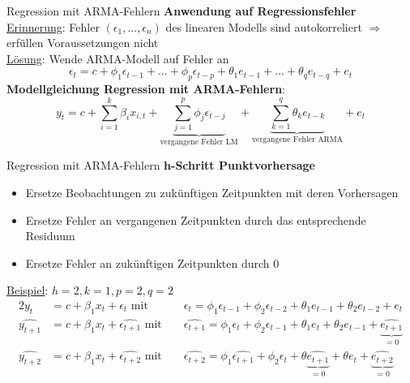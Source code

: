 \begin{frame}{Regression mit ARMA-Fehlern}
	\textbf{Anwendung auf Regressionsfehler} \\
	\underline{Erinnerung}: Fehler $(\epsilon_1,...,\epsilon_n)$ des linearen Modells sind autokorreliert $\Rightarrow$ erfüllen Voraussetzungen nicht\\
	\underline{Lösung}: Wende ARMA-Modell auf Fehler an
	$$\epsilon_{t} = c + \phi_1 \epsilon_{t-1} + ... + \phi_p \epsilon_{t-p} + \theta_1 e_{t-1} + ... + \theta_q e_{t-q} + e_t$$
	\textbf{Modellgleichung Regression mit ARMA-Fehlern}:
	$$y_t = c + \sum_{i=1}^{k}{\beta_i x_{i,t}} + \underbrace{\sum_{j=1}^{p}{\phi_j\epsilon_{t-j}}}_{\text{vergangene Fehler LM}} + \underbrace{\sum_{k=1}^{q}{\theta_k e_{t-k}}}_{\text{vergangene Fehler ARMA}} + e_t$$
	
\end{frame}
\begin{frame}{Regression mit ARMA-Fehlern}
	\textbf{h-Schritt Punktvorhersage}\\
	\begin{itemize}
		\item Ersetze Beobachtungen zu zukünftigen Zeitpunkten mit deren Vorhersagen
		\item Ersetze Fehler an vergangenen Zeitpunkten durch das entsprechende Residuum
		\item Ersetze Fehler an zukünftigen Zeitpunkten durch 0
	\end{itemize}
	\underline{Beispiel}: $h=2, k=1, p=2, q=2$
	\begin{alignat*}{2}
		y_t &= c + \beta_1 x_{t} + \epsilon_t \text{ mit }&&\epsilon_{t} = \phi_1\epsilon_{t-1} + \phi_2\epsilon_{t-2} + \theta_1e_{t-1} + \theta_2e_{t-2} + e_t \\		
		\widehat{y_{t+1}} &= c + \beta_1 x_{t} + \widehat{\epsilon_{t+1}} \text{ mit }&& \widehat{\epsilon_{t+1}} = \phi_1\epsilon_{t} + \phi_2\epsilon_{t-1} + \theta_1e_{t} + \theta_2e_{t-1} + \underbrace{\widehat{e_{t+1}}}_{=0}\\
		\widehat{y_{t+2}} &= c + \beta_1 x_{t} + \widehat{\epsilon_{t+2}}\text{ mit }&&\widehat{\epsilon_{t+2}} = \phi_1\widehat{\epsilon_{t+1}} + \phi_2\epsilon_t + \theta \underbrace{\widehat{e_{t+1}}}_{=0} + \theta e_t + \underbrace{\widehat{e_{t+2}}}_{=0}
	\end{alignat*}
\end{frame}
